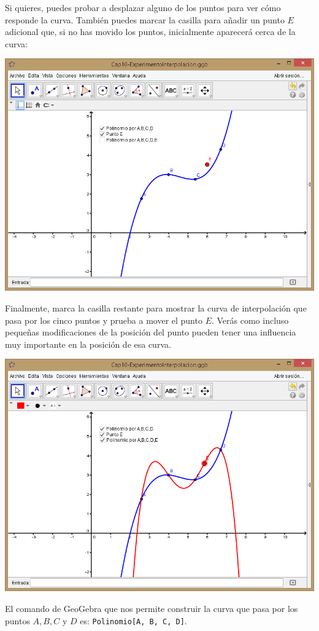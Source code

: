 \documentclass[10pt,a4paper]{article}\usepackage[]{graphicx}\usepackage[]{color}
\begin{document}
Si quieres, puedes probar a desplazar alguno de los puntos para ver cómo responde la curva. También puedes marcar la casilla para añadir un punto $E$ adicional que, si no has movido los puntos, inicialmente aparecerá cerca de la curva:
\begin{center}
    \includegraphics[width=15cm]{../fig/Tut10-17.png}
\end{center}
Finalmente, marca la casilla restante para mostrar la curva de interpolación que pasa por los cinco puntos y prueba a mover el punto $E$. Verás como incluso pequeñas modificaciones de la posición del punto pueden tener una influencia muy importante en la posición de esa curva.
\begin{center}
    \includegraphics[width=15cm]{../fig/Tut10-18.png}
\end{center}
El  comando de GeoGebra  que nos permite construir la curva que pasa por los puntos $A, B, C$ y $D$ es:
{\tt   Polinomio[A, B, C, D]}.
\end{document}
